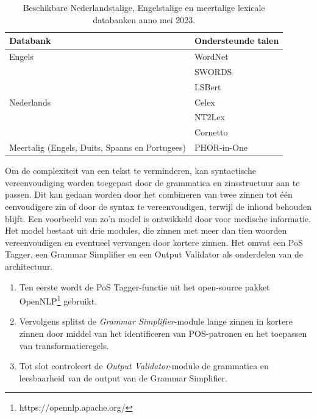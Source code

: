 \begin{center}
\begin{table}[H]
	\begin{tabular}{ | m{7cm} | m{7cm} | } 
		\hline
		\textbf{Databank} & \textbf{Ondersteunde talen} \\
		\hline
		Engels & WordNet \\
		& SWORDS \\
		& LSBert \\
		\hline
		Nederlands & Celex \\
		& NT2Lex \\
		& Cornetto \\
		\hline
		Meertalig (Engels, Duits, Spaans en Portugees) & PHOR-in-One \\
		\hline	
	\end{tabular}
	\caption{Beschikbare Nederlandstalige, Engelstalige en meertalige lexicale databanken anno mei 2023.}
	\label{table:lexical-databases}
\end{table}
\end{center}

\medspace

Om de complexiteit van een tekst te verminderen, kan syntactische vereenvoudiging worden toegepast door de grammatica en zinsstructuur aan te passen. Dit kan gedaan worden door het combineren van twee zinnen tot één eenvoudigere zin of door de syntax te vereenvoudigen, terwijl de inhoud behouden blijft. Een voorbeeld van zo'n model is ontwikkeld door \textcite{Kandula2010} voor medische informatie. Het model bestaat uit drie modules, die zinnen met meer dan tien woorden vereenvoudigen en eventueel vervangen door kortere zinnen. Het omvat een PoS Tagger, een Grammar Simplifier en een Output Validator als onderdelen van de architectuur.

\medspace

\begin{enumerate}
	\item Ten eerste wordt de PoS Tagger-functie uit het open-source pakket OpenNLP\footnote{https://opennlp.apache.org/} gebruikt.
	\item Vervolgens splitst de \textit{Grammar Simplifier}-module lange zinnen in kortere zinnen door middel van het identificeren van POS-patronen en het toepassen van transformatieregels.
	\item Tot slot controleert de \textit{Output Validator}-module de grammatica en leesbaarheid van de output van de Grammar Simplifier.
\end{enumerate}  

